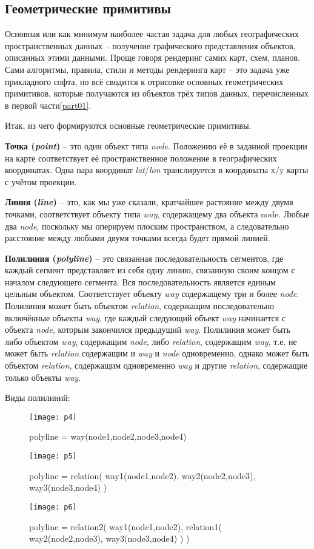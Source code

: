 \subsection{Геометрические примитивы}
Основная или как минимум наиболее частая задача для любых географических 
пространственных данных -- получение графического представления объектов, 
описанных этими данными. Проще говоря рендеринг самих карт, схем, планов. Сами 
алгоритмы, правила, стили и методы рендеринга карт -- это задача уже 
прикладного софта, но всё сводится к отрисовке основных геометрических 
примитивов, которые получаются из объектов трёх типов данных, перечисленных в 
первой части\ref{part01}.

Итак, из чего формируются основные геометрические примитивы.

\textbf{Точка (\emph{point})} -- это один объект типа \emph{node}. Положению 
её в заданной проекции на карте соответствует её пространственное положение в 
географических координатах. Одна пара координат \emph{lat}/\emph{lon} 
транслируется в координаты x/y карты с учётом проекции.

\textbf{Линия (\emph{line})} -- это, как мы уже сказали, кратчайшее растояние 
между двумя точками, соответствует объекту типа \emph{way}, содержащему два 
объекта node. Любые два \emph{node}, поскольку мы оперируем плоским 
пространством, а следовательно расстояние между любыми двумя точками всегда 
будет прямой линией.

\textbf{Полилиния (\emph{polyline})} -- это связанная последовательность 
сегментов, где каждый сегмент представляет из себя одну линию, связанную своим 
концом с началом следующего сегмента. Вся последовательность является единым 
цельным объектом. Соответствует объекту \emph{way} содержащему три и более 
\emph{node}. Полилиния может быть объектом \emph{relation}, содержащим 
последовательно включённые объекты \emph{way}, где каждый следующий объект 
\emph{way} начинается с объекта \emph{node}, которым закончился предыдущий 
\emph{way}. Полилиния может быть либо объектом \emph{way}, содержащим 
\emph{node}, либо \emph{relation}, содержащим \emph{way}, т.е. не может быть 
\emph{relation} содержащим и \emph{way} и \emph{node} одновременно, однако 
может быть объектом \emph{relation}, содержащим одновременно \emph{way} и 
другие \emph{relation}, содержащие только объекты \emph{way}.

Виды полилиний:

\begin{figure}[ht!]
    \texttt{[image: p4]}
    \caption{polyline = way(node1,node2,node3,node4)}
    \texttt{[image: p5]}
    \caption{polyline = relation( way1(node1,node2), way2(node2,node3), way3(node3,node4) )}
    \texttt{[image: p6]}
    \caption{polyline = relation2( way1(node1,node2), relation1( way2(node2,node3), way3(node3,node4) ) )}
\end{figure}

